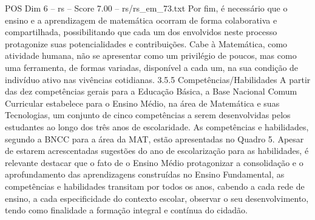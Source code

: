 \begin{textsample}{POS Dim 6 – rs – Score 7.00 – rs/rs\_em\_73.txt}
Por fim, é necessário que o ensino e a aprendizagem de matemática ocorram de forma colaborativa e compartilhada, possibilitando que cada um dos envolvidos neste processo protagonize suas potencialidades e contribuições.
Cabe à Matemática, como atividade humana, não se apresentar como um privilégio de poucos, mas como uma ferramenta, de formas variadas, disponível a cada um, na sua condição de indivíduo ativo nas vivências cotidianas. 3.5.5 Competências/Habilidades A partir das dez competências gerais para a Educação Básica, a Base Nacional Comum Curricular estabelece para o Ensino Médio, na área de Matemática e suas Tecnologias, um conjunto de cinco competências a serem desenvolvidas pelos estudantes ao longo dos três anos de escolaridade.
As competências e habilidades, segundo a BNCC para a área da MAT, estão apresentadas no Quadro 5.
Apesar de estarem acrescentadas sugestões do ano de escolarização para as habilidades, é relevante destacar que o fato de o Ensino Médio protagonizar a consolidação e o aprofundamento das aprendizagens construídas no Ensino Fundamental, as competências e habilidades transitam por todos os anos, cabendo a cada rede de ensino, a cada especificidade do contexto escolar, observar o seu desenvolvimento, tendo como finalidade a formação integral e contínua do cidadão.

\end{textsample}
